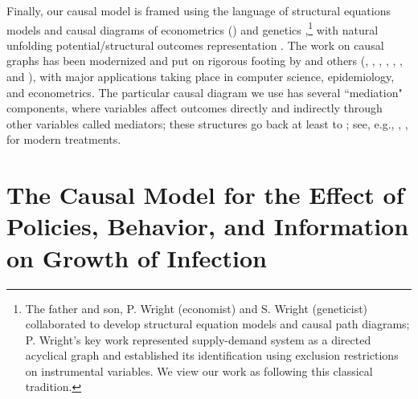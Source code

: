 \documentclass[11pt,reqno,letter]{amsart}
\theoremstyle{definition}
\begin{document}
Finally, our causal model is framed using the language of structural equations models and causal diagrams of econometrics (\cite{pwright, haavelmo:1944, tinbergen:1940, wold:1954, pearl:biometrika}) and genetics \citep{wright1923},\footnote{The father and son, P. Wright (economist) and S. Wright (geneticist) collaborated to develop structural equation models and causal path diagrams; P. Wright's key work represented supply-demand system as a directed acyclical graph and established its identification using exclusion restrictions on instrumental variables. We view our work as following this classical tradition.} with natural unfolding potential/structural outcomes representation \citep{rubin1974,tinbergen1930,neyman:PO,imbens_rubin_2015}. The work on causal graphs has been modernized and put on rigorous footing by  \cite{pearl:biometrika} and others (\cite{pearl:robins}, \cite{pearl:causality}, \cite{pearl:why}, \cite{white:chalak},  \cite{heckman:pinto}, \cite{peters2020book}, and \cite{hernanrobins2020book}), with major applications taking place in computer science, epidemiology, and econometrics. The particular causal diagram we use has several ``mediation" components, where variables affect outcomes directly and indirectly through other variables called mediators; these structures go back at least to \citet[][see Figure 6]{wright1923}; see, e.g., \cite{baron1986}, \cite{Hines2020}, \cite{richardson:mediation} for modern treatments. 

\section{The Causal Model for the Effect of Policies, Behavior, and Information on Growth of Infection}\label{sec:causal-model}
\end{document}

